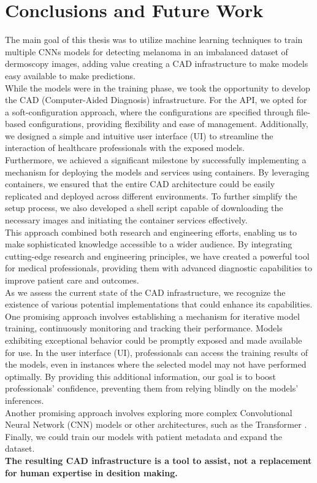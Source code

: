 \section{Conclusions and Future Work}
\label{cap:concl}

The main goal of this thesis was to utilize machine learning techniques to
train multiple CNNs models for detecting melanoma in an imbalanced dataset of
dermoscopy images, adding value creating a CAD infrastructure to make models easy
available to make predictions. \\

While the models were in the training phase, we took the opportunity to develop
the CAD (Computer-Aided Diagnosis) infrastructure. For the API, we opted for a
soft-configuration approach, where the configurations are specified through
file-based configurations, providing flexibility and ease of management.
Additionally, we designed a simple and intuitive user interface (UI) to
streamline the interaction of healthcare professionals with the exposed models.
\\

Furthermore, we achieved a significant milestone by successfully implementing a
mechanism for deploying the models and services using containers. By leveraging
containers, we ensured that the entire CAD architecture could be easily
replicated and deployed across different environments. To further simplify the
setup process, we also developed a shell script capable of downloading the
necessary images and initiating the container services effectively. \\

This approach combined both research and engineering efforts, enabling us to
make sophisticated knowledge accessible to a wider audience. By integrating
cutting-edge research and engineering principles, we have created a powerful
tool for medical professionals, providing them with advanced diagnostic
capabilities to improve patient care and outcomes. \\

As we assess the current state of the CAD infrastructure, we recognize the
existence of various potential implementations that could enhance its
capabilities. One promising approach involves establishing a mechanism for
iterative model training, continuously monitoring and tracking their
performance. Models exhibiting exceptional behavior could be promptly exposed
and made available for use. In the user interface (UI), professionals can
access the training results of the models, even in instances where the selected
model may not have performed optimally. By providing this additional
information, our goal is to boost professionals' confidence, preventing them
from relying blindly on the models' inferences. \\

Another promising approach involves exploring more complex Convolutional Neural
Network (CNN) models or other architectures, such as the Transformer
\cite{Transformer}. Finally, we could train our models with patient metadata
and expand the dataset. \\

{\bf The resulting CAD infrastructure is a tool to assist, not a replacement for
human expertise in desition making.}
